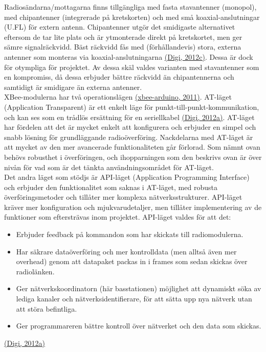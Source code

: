 \documentclass[a4paper,11pt]{article}
\begin{document}
Radiosändarna/mottagarna finns tillgängliga med fasta stavantenner (monopol), med chipantenner (integrerade på kretskorten) och med små koaxial-anslutningar (U.FL) för extern antenn. Chipantenner utgör det smidigaste alternativet eftersom de tar lite plats och är ytmonterade direkt på kretskortet, men ger sämre signalräckvidd. Bäst räckvidd fås med (förhållandevis) stora, externa antenner som monteras via koaxial-anslutningarna \hyperref[digi]{(Digi, 2012c)}. Dessa är dock för otympliga för projektet. Av dessa skäl valdes varianten med stavantenner som en kompromiss, då dessa erbjuder bättre räckvidd än chipantennerna och samtidigt är smidigare än externa antenner. \\

XBee-modulerna har två operationslägen \hyperref[xbeearduino]{(xbee-arduino, 2011)}. AT-läget (Application Transparent) är ett enkelt läge för punkt-till-punkt-kommunikation, och kan ses som en trådlös ersättning för en seriellkabel \hyperref[digi]{(Digi, 2012a)}. AT-läget har fördelen att det är mycket enkelt att konfigurera och erbjuder en simpel och snabb lösning för grundläggande radioöverföring. Nackdelarna med AT-läget är att mycket av den mer avancerade funktionaliteten går förlorad. Som nämnt ovan behövs robusthet i överföringen, och ihopparningen som den beskrivs ovan är över nivån för vad som är det tänkta användningsområdet för AT-läget. \\

Det andra läget som stödjs är API-läget (Application Programming Interface) och erbjuder den funktionalitet som saknas i AT-läget, med robusta överföringsmetoder och tillåter mer komplexa nätverksstrukturer. API-läget kräver mer konfiguration och mjukvarudetaljer, men tillåter implementering av de funktioner som eftersträvas inom projektet. API-läget valdes för att det:
	
	\begin{itemize}
	\item Erbjuder feedback på kommandon som har skickats till radiomodulerna.
    	\item Har säkrare dataöverföring och mer kontrolldata (men alltså även mer overhead) genom att datapaket packas in i frames som sedan skickas över radiolänken.
    	\item Ger nätverkskoordinatorn (här basstationen) möjlighet att dynamiskt söka av lediga kanaler och nätverksidentifierare, för att sätta upp nya nätverk utan att störa befintliga.
    	\item Ger programmareren bättre kontroll över nätverket och den data som skickas.
    	\end{itemize}
\hyperref[digi]{(Digi, 2012a)}\\
    	
\end{document}
